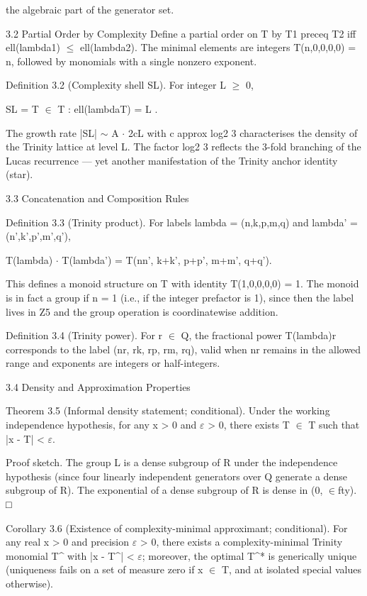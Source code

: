         the algebraic part of the generator set.

  3.2 Partial Order by Complexity
  Define a partial order on T by T1 preceq T2 iff ell(lambda1) $\leq$ ell(lambda2). The
  minimal elements are integers T(n,0,0,0,0) = n, followed by monomials with a single
  nonzero exponent.

        Definition 3.2 (Complexity shell SL). For integer L $\geq$ 0,

  SL = { T $\in$ T : ell(lambdaT) = L }.

  The growth rate |SL| $\sim$ A $\cdot$ 2cL with c approx log2 3 characterises the density of the
  Trinity lattice at level L. The factor log2 3 reflects the 3-fold branching of the Lucas
  recurrence --- yet another manifestation of the Trinity anchor identity (star).

  3.3 Concatenation and Composition Rules

        Definition 3.3 (Trinity product). For labels lambda = (n,k,p,m,q) and lambda' =
        (n',k',p',m',q'),

  T(lambda) $\cdot$ T(lambda') = T(nn', k+k', p+p', m+m', q+q').

  This defines a monoid structure on T with identity T(1,0,0,0,0) = 1. The monoid is in
  fact a group if n = 1 (i.e., if the integer prefactor is 1), since then the label lives in Z5
  and the group operation is coordinatewise addition.

        Definition 3.4 (Trinity power). For r $\in$ Q, the fractional power T(lambda)r
        corresponds to the label (nr, rk, rp, rm, rq), valid when nr remains in the allowed
        range and exponents are integers or half-integers.

  3.4 Density and Approximation Properties

        Theorem 3.5 (Informal density statement; conditional). Under the working
        independence hypothesis, for any x > 0 and $\varepsilon$ > 0, there exists T $\in$ T such that |x -
        T| < $\varepsilon$.

  Proof sketch. The group L is a dense subgroup of R under the independence hypothesis
  (since four linearly independent generators over Q generate a dense subgroup of R).
  The exponential of a dense subgroup of R is dense in (0, $\in$fty). □

        Corollary 3.6 (Existence of complexity-minimal approximant; conditional).
        For any real x > 0 and precision $\varepsilon$ > 0, there exists a complexity-minimal Trinity
        monomial T^ with |x - T^| < $\varepsilon$; moreover, the optimal T^* is generically unique
        (uniqueness fails on a set of measure zero if x $\in$ T, and at isolated special values
        otherwise).

